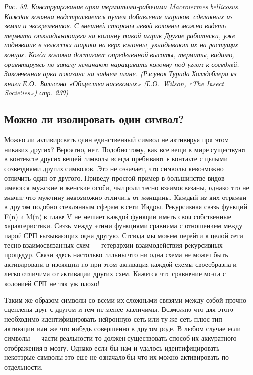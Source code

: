 \documentclass[../main.tex]{subfiles}
\begin{document}
\emph{Рис. 69. Конструирование арки термитами-рабочими Macrotermes bellicosus. Каждая колонна надстраивается путем добавления шариков, сделанных из земли и экскрементов. С внешней стороны левой колонны можно видеть термита откладывающего на колонну такой шарик Другие работники, уже поднявшие в челюстях шарики на верх колонны, укладывают их на растущих концах. Когда колонна достигает определенной высоты, термиты, видимо, ориентируясь по запаху начинают наращивать колонну под углом к соседней. Законченная арка показана на заднем плане. (Рисунок Турида Холлдоблера из книги Е.О.~Вильсона «Общества насекомых» (Е.О.~Wilson, «The Insect Societies») стр. 230)}

\subsection{Можно ли изолировать один символ?}

Можно ли активировать один единственный символ не активируя при этом никаких других? Вероятно, нет. Подобно тому, как все вещи в мире существуют в контексте других вещей символы всегда пребывают в контакте с целыми созвездиями других символов. Это не означает, что символы невозможно отличить один от другого. Приведу простой пример в большинстве видов имеются мужские и женские особи, чьи роли тесно взаимосвязаны, однако это не значит что мужчину невозможно отличить от женщины. Каждый из них отражен в другом подобно стеклянным сферам в сети Индры. Рекурсивная связь функций F(n) и M(n) в главе V не мешает каждой функции иметь свои собственные характеристики. Связь между этими функциями сравнима с отношением между парой СРП вызывающих одна другую. Отсюда мы можем перейти к целой сети тесно взаимосвязанных схем --- гетерархии взаимодействия рекурсивных процедур. Связи здесь настолько сильны что ни одна схема не может быть активирована в изоляции но при этом активация каждой схемы своеобразна и легко отличима от активации других схем. Кажется что сравнение мозга с колонией СРП не так уж плохо!

Таким же образом символы со всеми их сложными связями между собой прочно сцеплены друг с другом и тем не менее различимы. Возможно что для этого необходимо идентифицировать нейронную сеть или ту же сеть плюс тип активации или же что нибудь совершенно в другом роде. В любом случае если символы --- части реальности то должен существовать способ их аккуратного отображения в мозгу. Однако если бы нам и удалось идентифицировать некоторые символы это еще не означало бы что их можно активировать по отдельности.
\end{document}
